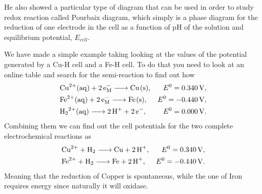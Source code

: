 \nt
{
    He also showed a particular type of diagram that can be used in order to study redox reaction called Pourbaix diagram, which simply is a phase diagram for the reduction of one electrode in the cell as a function of pH of the solution and equilibrium potential, $E_{cell}$.
}

{
    We have made a simple example taking looking at the values of the potential generated by a Cu-H cell and a Fe-H cell. To do that you need to look at an online table and search for the semi-reaction to find out how
    \begin{align*}
        &\ce{Cu^{2+}(aq) + 2e^-_M -> Cu(s)}, &E^0 = \SI{+0.340}{V},\\
        &\ce{Fe^{2+}(aq) + 2e^-_M -> Fe(s)}, &E^0 = \SI{-0.440}{V},\\
        &\ce{H_2^{2+}(aq) -> 2H^+ + 2e^-}, &E^0 = \SI{+0.000}{V}.\\
    \end{align*}
    Combining them we can find out the cell potentials for the two complete electrochemical reactions as
    \begin{align*}
        &\ce{Cu^{2+} + H_2 -> Cu + 2H^+}, &E^0 = \SI{+0.340}{V},\\
        &\ce{Fe^{2+} + H_2 -> Fe + 2H^+}, &E^0 = \SI{-0.440}{V}.\\
    \end{align*}
    Meaning that the reduction of Copper is spontaneous, while the one of Iron requires energy since naturally it will oxidase.
}